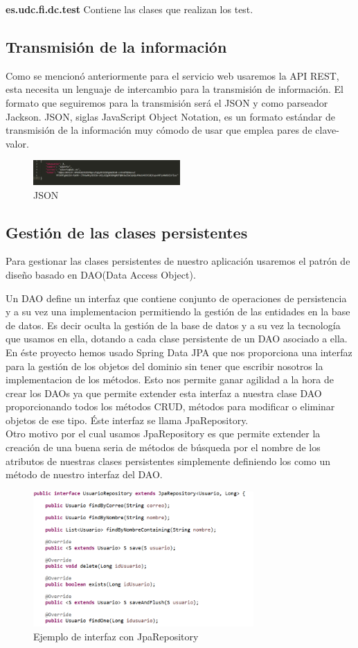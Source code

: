 \textbf{es.udc.fi.dc.test} Contiene las clases que realizan los test.
\subsection{Transmisión de la información}
Como se mencionó anteriormente para el servicio web usaremos la API REST, esta necesita un lenguaje de intercambio para la transmisión de información. El formato que seguiremos para la transmisión será el JSON y como parseador Jackson.
JSON, siglas JavaScript Object Notation, es un formato estándar de transmisión de la información muy cómodo de usar que emplea pares de clave-valor.
	\begin{figure}[H]
		\centering
		\includegraphics[width=0.5\textwidth] {json.PNG}
		\caption{JSON }
	\end{figure}
\subsection{Gestión de las clases persistentes}
Para gestionar las clases persistentes de nuestro aplicación usaremos el patrón de diseño basado en DAO(Data Access Object).

 Un DAO define un interfaz que contiene conjunto de operaciones de persistencia y a su vez una implementacion permitiendo la gestión de las entidades en la base de datos. Es decir oculta la gestión de la base de datos y a su vez la tecnología que usamos en ella, dotando a cada clase persistente de un DAO asociado a ella. En éste proyecto hemos usado Spring Data JPA que nos proporciona una interfaz para la gestión de los objetos del dominio sin tener que escribir nosotros la implementacion de los métodos. Esto nos permite ganar agilidad a la hora de crear los DAOs ya que permite extender esta interfaz a nuestra clase DAO proporcionando todos los métodos CRUD, métodos para modificar o eliminar objetos de ese tipo. Éste interfaz se llama JpaRepository.\\


Otro motivo por el cual usamos JpaRepository es que permite extender la creación de una buena seria de métodos de búsqueda por el nombre de los atributos de nuestras clases persistentes simplemente definiendo los como un método de nuestro interfaz del DAO.
	\begin{figure}[H]
		\centering
		\includegraphics[width=0.75\textwidth] {jparepository.PNG}
		\caption{Ejemplo de interfaz con JpaRepository }
	\end{figure}
